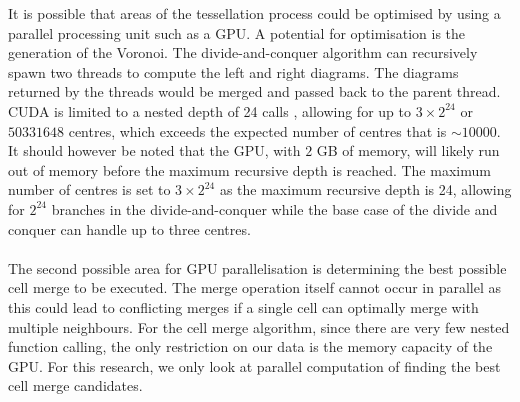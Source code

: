 It is possible that areas of the tessellation process could be optimised by using a parallel processing unit such as a GPU. A potential for optimisation is the generation of the Voronoi. The divide-and-conquer algorithm can recursively spawn two threads to compute the left and right diagrams. The diagrams returned by the threads would be merged and passed back to the parent thread. CUDA is limited to a nested depth of 24 calls \citep{CUDA}, allowing for up to $3 \times 2^{24}$ or $50331648$ centres, which exceeds the expected number of centres that is $\sim10000$. It should however be noted that the GPU, with $2$ GB of memory, will likely run out of memory before the maximum recursive depth is reached. The maximum number of centres is set to $3 \times 2^{24}$ as the maximum recursive depth is 24, allowing for $2^{24}$ branches in the divide-and-conquer while the base case of the divide and conquer can handle up to three centres.
\\
\\
The second possible area for GPU parallelisation is determining the best possible cell merge to be executed. The merge operation itself cannot occur in parallel as this could lead to conflicting merges if a single cell can optimally merge with multiple neighbours. For the cell merge algorithm, since there are very few nested function calling, the only restriction on our data is the memory capacity of the GPU. For this research, we only look at parallel computation of finding the best cell merge candidates.